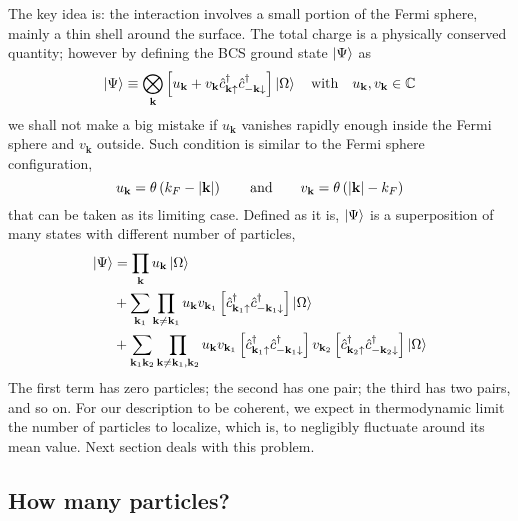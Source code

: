The key idea is: the interaction involves a small portion of the Fermi sphere, mainly a thin shell around the surface. The total charge is a physically conserved quantity; however by defining the BCS ground state $\ket{\Psi}$ as
\begin{equation}\label{eq:bcs ground state general form}
	\ket{\Psi} \equiv \bigotimes_\mathbf{k} \lrS{u_\mathbf{k} + v_\mathbf{k} \hat{c}_{\mathbf{k}\uparrow}^\dagger \hat{c}_{-\mathbf{k}\downarrow}^\dagger} \ket{\Omega}
	\qq{with}
	u_\mathbf{k}, v_\mathbf{k} \in \C
\end{equation}
we shall not make a big mistake if $u_\mathbf{k}$ vanishes rapidly enough inside the Fermi sphere and $v_\mathbf{k}$ outside. Such condition is similar to the Fermi sphere configuration,
\[
	u_\mathbf{k} = \theta\lrR{k_F - \abs{\mathbf{k}}}
	\quad\qq{and}\quad
	v_\mathbf{k} = \theta\lrR{\abs{\mathbf{k}} - k_F}
\]
that can be taken as its limiting case.
Defined as it is, $\ket{\Psi}$ is a superposition of many states with different number of particles,
\[
\begin{aligned}
	\ket{\Psi} &= \prod_\mathbf{k} u_\mathbf{k} \ket{\Omega} \\
	&+ \sum_{\mathbf{k}_1} \prod_{\mathbf{k} \neq \mathbf{k}_1} u_\mathbf{k} v_{\mathbf{k}_1} \left[{\hat{c}_{\mathbf{k}_1\uparrow}^\dagger \hat{c}_{-\mathbf{k}_1\downarrow}^\dagger}\right] \ket{\Omega} \\
	&+ \sum_{\mathbf{k}_1 \mathbf{k}_2} \prod_{\mathbf{k} \neq \mathbf{k}_1, \mathbf{k}_2} u_\mathbf{k} v_{\mathbf{k}_1} \left[{\hat{c}_{\mathbf{k}_1\uparrow}^\dagger \hat{c}_{-\mathbf{k}_1\downarrow}^\dagger}\right] v_{\mathbf{k}_2} \left[{\hat{c}_{\mathbf{k}_2\uparrow}^\dagger \hat{c}_{-\mathbf{k}_2\downarrow}^\dagger}\right] \ket{\Omega}
\end{aligned}
\]
The first term has zero particles; the second has one pair; the third has two pairs, and so on. For our description to be coherent, we expect in thermodynamic limit the number of particles to localize, which is, to negligibly fluctuate around its mean value. Next section deals with this problem.

\subsection{How many particles?}

